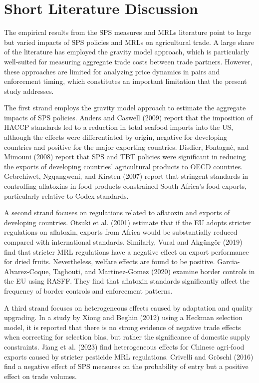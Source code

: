 \documentclass[12pt]{article}
\begin{document}
\section{Short Literature Discussion}

The empirical results from the SPS measures and MRLs literature point to large but varied impacts of SPS policies and MRLs on agricultural trade. A large share of the literature has employed the gravity model approach, which is particularly well-suited for measuring aggregate trade costs between trade partners. However, these approaches are limited for analyzing price dynamics in pairs and enforcement timing, which constitutes an important limitation that the present study addresses.

The first strand employs the gravity model approach to estimate the aggregate impacts of SPS policies. Anders and Caswell (2009)\cite{anders2009} report that the imposition of HACCP standards led to a reduction in total seafood imports into the US, although the effects were differentiated by origin, negative for developing countries and positive for the major exporting countries. Disdier, Fontagné, and Mimouni (2008)\cite{disdier2008} report that SPS and TBT policies were significant in reducing the exports of developing countries’ agricultural products to OECD countries. Gebrehiwet, Ngqangweni, and Kirsten (2007)\cite{gebrehiwet2007} report that stringent standards in controlling aflatoxins in food products constrained South Africa's food exports, particularly relative to Codex standards.

A second strand focuses on regulations related to aflatoxin and exports of developing countries. Otsuki et al. (2001)\cite{otsuki2001} estimate that if the EU adopts stricter regulations on aflatoxin, exports from Africa would be substantially reduced compared with international standards. Similarly, Vural and Akgüngör (2019)\cite{vural2019} find that stricter MRL regulations have a negative effect on export performance for dried fruits. Nevertheless, welfare effects are found to be positive. Garcia-Alvarez-Coque, Taghouti, and Martinez-Gomez (2020)\cite{garcia2020} examine border controls in the EU using RASFF. They find that aflatoxin standards significantly affect the frequency of border controls and enforcement patterns.

A third strand focuses on heterogeneous effects caused by adaptation and quality upgrading. In a study by Xiong and Beghin (2012)\cite{xiong2012} using a Heckman selection model, it is reported that there is no strong evidence of negative trade effects when correcting for selection bias, but rather the significance of domestic supply constraints. Jiang et al. (2023)\cite{jiang2023} find heterogeneous effects for Chinese agri-food exports caused by stricter pesticide MRL regulations. Crivelli and Gröschl (2016)\cite{crivelli2016} find a negative effect of SPS measures on the probability of entry but a positive effect on trade volumes.
\end{document}
